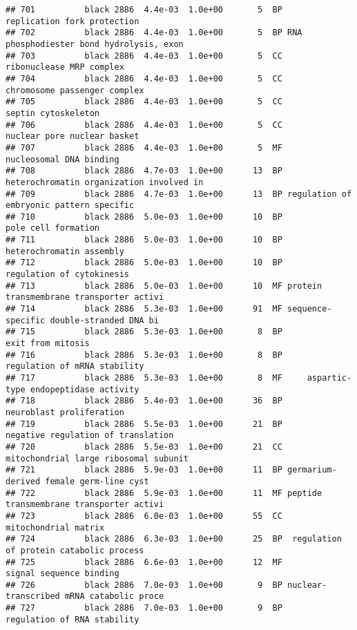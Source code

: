 \documentclass[]{article}
\begin{document}
\begin{verbatim}
## 701          black 2886  4.4e-03  1.0e+00       5  BP              replication fork protection
## 702          black 2886  4.4e-03  1.0e+00       5  BP RNA phosphodiester bond hydrolysis, exon
## 703          black 2886  4.4e-03  1.0e+00       5  CC                 ribonuclease MRP complex
## 704          black 2886  4.4e-03  1.0e+00       5  CC             chromosome passenger complex
## 705          black 2886  4.4e-03  1.0e+00       5  CC                      septin cytoskeleton
## 706          black 2886  4.4e-03  1.0e+00       5  CC              nuclear pore nuclear basket
## 707          black 2886  4.4e-03  1.0e+00       5  MF                  nucleosomal DNA binding
## 708          black 2886  4.7e-03  1.0e+00      13  BP heterochromatin organization involved in
## 709          black 2886  4.7e-03  1.0e+00      13  BP regulation of embryonic pattern specific
## 710          black 2886  5.0e-03  1.0e+00      10  BP                      pole cell formation
## 711          black 2886  5.0e-03  1.0e+00      10  BP                 heterochromatin assembly
## 712          black 2886  5.0e-03  1.0e+00      10  BP                regulation of cytokinesis
## 713          black 2886  5.0e-03  1.0e+00      10  MF protein transmembrane transporter activi
## 714          black 2886  5.3e-03  1.0e+00      91  MF sequence-specific double-stranded DNA bi
## 715          black 2886  5.3e-03  1.0e+00       8  BP                        exit from mitosis
## 716          black 2886  5.3e-03  1.0e+00       8  BP             regulation of mRNA stability
## 717          black 2886  5.3e-03  1.0e+00       8  MF     aspartic-type endopeptidase activity
## 718          black 2886  5.4e-03  1.0e+00      36  BP                 neuroblast proliferation
## 719          black 2886  5.5e-03  1.0e+00      21  BP       negative regulation of translation
## 720          black 2886  5.5e-03  1.0e+00      21  CC    mitochondrial large ribosomal subunit
## 721          black 2886  5.9e-03  1.0e+00      11  BP germarium-derived female germ-line cyst 
## 722          black 2886  5.9e-03  1.0e+00      11  MF peptide transmembrane transporter activi
## 723          black 2886  6.0e-03  1.0e+00      55  CC                     mitochondrial matrix
## 724          black 2886  6.3e-03  1.0e+00      25  BP  regulation of protein catabolic process
## 725          black 2886  6.6e-03  1.0e+00      12  MF                  signal sequence binding
## 726          black 2886  7.0e-03  1.0e+00       9  BP nuclear-transcribed mRNA catabolic proce
## 727          black 2886  7.0e-03  1.0e+00       9  BP              regulation of RNA stability

\end{verbatim}
\end{document}
